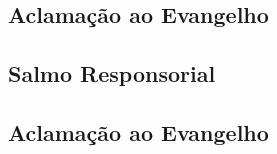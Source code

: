 \subsection{Aclamação ao Evangelho}\label{subsection:natal/epifania/aclamacao}

\label{section:natal/batismo}

\subsection{Salmo Responsorial}\label{subsection:natal/batismo/salmo-responsorial}

\subsection{Aclamação ao Evangelho}\label{subsection:natal/batismo/aclamacao}